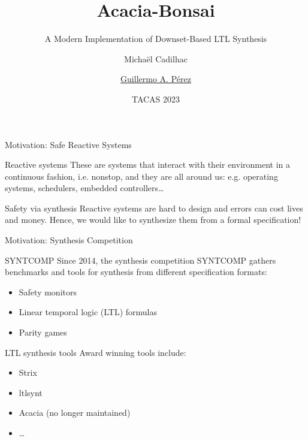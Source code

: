 \documentclass[aspectratio=169]{beamer}
\title{Acacia-Bonsai}
\subtitle{A Modern Implementation of Downset-Based LTL Synthesis}
\author{Micha\"el Cadilhac \and \underline{Guillermo A. P\'erez}}
\date{TACAS 2023}
\begin{document}
\begin{frame}
	\titlepage
\end{frame}

\begin{frame}{Motivation: Safe Reactive Systems}
  \begin{block}{Reactive systems}
    These are systems that interact with their environment in a
    \alert{continuous} fashion, i.e. nonstop, and they are all around us:
    e.g. operating systems, schedulers, embedded controllers\dots
  \end{block}
  \begin{center}
  \end{center}
  \pause
  \begin{block}{Safety via synthesis}
    Reactive systems are hard to design and errors can \alert{cost lives} and
    money. Hence, we would like to \alert{synthesize them} from a formal
    specification!
  \end{block}
\end{frame}

\begin{frame}{Motivation: Synthesis Competition}
  \begin{block}{SYNTCOMP}
    Since 2014, the synthesis competition SYNTCOMP gathers benchmarks and
    tools for synthesis from different specification formats:
    \begin{itemize}
      \item Safety monitors
      \item \alert{Linear temporal logic (LTL) formulas}
      \item Parity games
    \end{itemize}
  \end{block}
  \pause
  \begin{block}{LTL synthesis tools}
    Award winning tools include:
    \begin{itemize}
      \item Strix
      \item ltlsynt
      \item \alert{Acacia (no longer maintained)}
      \item \dots
    \end{itemize}
  \end{block}
\end{frame}
\end{document}
